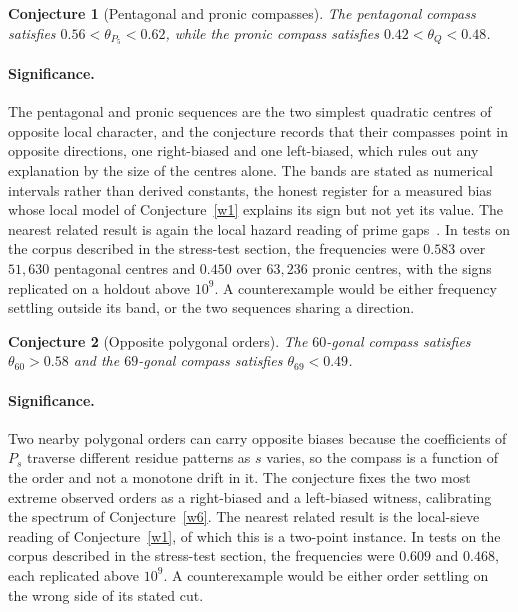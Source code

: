 \documentclass[11pt]{article}
\newtheorem{conjecture}{Conjecture}
\theoremstyle{definition}
\begin{document}
\begin{conjecture}[Pentagonal and pronic compasses]\label{w2}
The pentagonal compass satisfies $0.56<\theta_{P_5}<0.62$, while the pronic compass satisfies $0.42<\theta_Q<0.48$.
\end{conjecture}

\paragraph{Significance.}
The pentagonal and pronic sequences are the two simplest quadratic centres of opposite local character, and the conjecture records that their compasses point in opposite directions, one right-biased and one left-biased, which rules out any explanation by the size of the centres alone.  The bands are stated as numerical intervals rather than derived constants, the honest register for a measured bias whose local model of Conjecture~\ref{w1} explains its sign but not yet its value.  The nearest related result is again the local hazard reading of prime gaps~\cite{Granville}.  In tests on the corpus described in the stress-test section, the frequencies were $0.583$ over $51{,}630$ pentagonal centres and $0.450$ over $63{,}236$ pronic centres, with the signs replicated on a holdout above $10^9$.  A counterexample would be either frequency settling outside its band, or the two sequences sharing a direction.

\begin{conjecture}[Opposite polygonal orders]\label{w3}
The $60$-gonal compass satisfies $\theta_{60}>0.58$ and the $69$-gonal compass satisfies $\theta_{69}<0.49$.
\end{conjecture}

\paragraph{Significance.}
Two nearby polygonal orders can carry opposite biases because the coefficients of $P_s$ traverse different residue patterns as $s$ varies, so the compass is a function of the order and not a monotone drift in it.  The conjecture fixes the two most extreme observed orders as a right-biased and a left-biased witness, calibrating the spectrum of Conjecture~\ref{w6}.  The nearest related result is the local-sieve reading of Conjecture~\ref{w1}, of which this is a two-point instance.  In tests on the corpus described in the stress-test section, the frequencies were $0.609$ and $0.468$, each replicated above $10^9$.  A counterexample would be either order settling on the wrong side of its stated cut.
\end{document}
